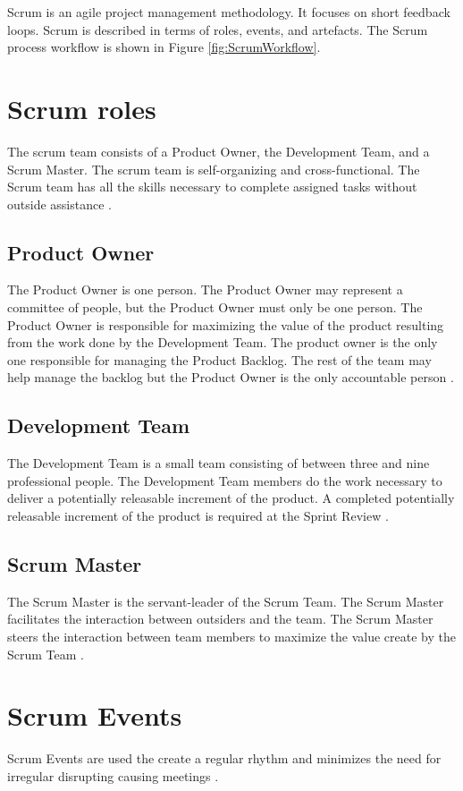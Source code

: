 Scrum is an agile project management methodology. It focuses on short feedback
loops. Scrum is described in terms of roles, events, and artefacts. The Scrum 
process workflow is shown in Figure \ref{fig:ScrumWorkflow}.

\section{Scrum roles}
The scrum team consists of a Product Owner, the Development Team, and a Scrum Master.
The scrum team is self-organizing and cross-functional. The Scrum team has all the skills 
necessary to complete assigned tasks without outside assistance \parencite{TheScrumGuide}.

\subsection{Product Owner}
The Product Owner is one person. The Product Owner may represent a committee of people, 
but the Product Owner must only be one person. The Product Owner is responsible 
for maximizing the value of the product resulting from the work done by the 
Development Team. The product owner is the only one responsible for managing the
Product Backlog. The rest of the team may help manage the backlog but the 
Product Owner is the only accountable person  \parencite{TheScrumGuide}.

\subsection{Development Team}
The Development Team is a small team consisting of between three and nine 
professional people. The Development Team members do the work necessary to 
deliver a potentially releasable increment of the product. A completed potentially
releasable increment of the product is required at the Sprint Review  \parencite{TheScrumGuide}.

\subsection{Scrum Master}
The Scrum Master is the servant-leader of the Scrum Team. The Scrum Master 
facilitates the interaction between outsiders and the team. The Scrum Master steers 
the interaction between team members to maximize the value create by the 
Scrum Team  \parencite{TheScrumGuide}.

\section{Scrum Events}
Scrum Events are used the create a regular rhythm and minimizes the need for 
irregular disrupting causing meetings \parencite{TheScrumGuide}.

